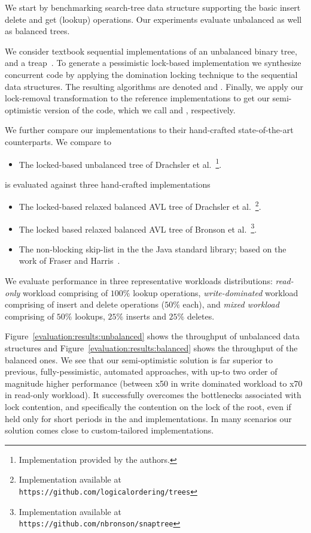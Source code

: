 We start by benchmarking search-tree data structure supporting the basic insert
delete and get (lookup) operations. Our experiments evaluate unbalanced as well
as balanced trees.  

We consider textbook sequential implementations of an unbalanced binary
tree, and a treap~\cite{AragonS1989}. To
generate a pessimistic lock-based implementation we synthesize
concurrent code by applying the domination locking technique to the sequential
data structures. The resulting algorithms are denoted \domTree and \domTreap.
Finally, we apply our lock-removal transformation to the reference
implementations to get our semi-optimistic version of the code, which we call
\autoTree and \autoTreap, respectively.     

We further compare our implementations to their hand-crafted state-of-the-art counterparts. We compare \autoTree to
\begin{itemize}
\item \danaTree The locked-based 
				unbalanced tree of Drachsler et
				al.~\cite{DrachslerVY2014}\footnote{Implementation provided by the authors.}.
\end{itemize}
\autoTreap is evaluated against three hand-crafted implementations
\begin{itemize}
\setlength{\itemsep}{0pt}
\setlength{\parskip}{0pt}
\item \danaAVL The locked-based relaxed balanced AVL tree of 
				Drachsler et al.~\cite{DrachslerVY2014}\footnote{Implementation available at \\
				\texttt{https://github.com/logicalordering/trees}}.
\item \bronson The locked based relaxed balanced AVL tree
				of Bronson et al.~\cite{BronsonCCO2010}\footnote{Implementation available at \\
				\texttt{https://github.com/nbronson/snaptree}}.
\item \skiplist The non-blocking skip-list in the 
				the Java standard library; based on the work of
				Fraser and Harris~\cite{fraser2004practical}.
\end{itemize}


We evaluate performance in three representative workloads distributions:
\emph{read-only} workload comprising of $100\%$ lookup operations, \emph{write-dominated}
workload comprising of insert and delete operations ($50\%$ each), and
\emph{mixed workload} comprising of $50\%$ lookups, $25\%$ inserts and $25\%$
deletes.

Figure~\ref{evaluation:results:unbalanced} 
shows the throughput of unbalanced data structures and Figure~\ref{evaluation:results:balanced} shows
the throughput of the balanced ones. We see that our semi-optimistic
solution is far superior to previous, fully-pessimistic, 
automated approaches, with up-to two order of magnitude higher performance
(between x50 in write dominated workload to x70 in read-only workload). It
successfully overcomes the bottlenecks associated with lock contention, and 
specifically the contention on the lock of the root, even if held only for short
periods in the \domTree and \domTreap implementations. In
many scenarios our solution comes close to custom-tailored implementations. 

